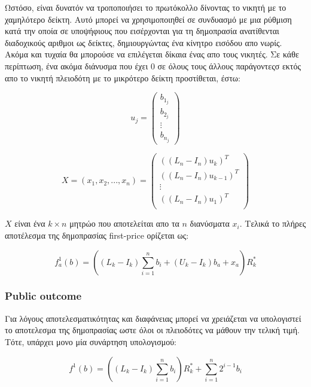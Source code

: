 \documentclass[letterpaper,11pt]{article}
\begin{document}
Ωστόσο, είναι δυνατόν να τροποποιήσει το πρωτόκολλο δίνοντας το νικητή με το χαμηλότερο δείκτη. Αυτό μπορεί να χρησιμοποιηθεί σε συνδυασμό με μια
ρύθμιση κατά την οποία σε υποψήφιους που εισέρχονται για τη δημοπρασία ανατίθενται διαδοχικούς αριθμοι ως δείκτες, δημιουργώντας ένα κίνητρο
εισόδου απο νωρίς. Ακόμα και τυχαία θα μπορούσε να επιλέγεται δίκαια ένας απο τους νικητές. Σε κάθε περίπτωση, ένα ακόμα διάνυσμα που έχει 0 σε
όλους τους άλλους παράγοντεςσ εκτός απο το νικητή πλειοδότη με το μικρότερο δείκτη προστίθεται, έστω:

\begin{displaymath}
	u_j =
	\left ( \begin{array}{c}
		b_{1_j} \\
		b_{2_j} \\
		\vdots	\\
		b_{n_j}
	\end{array} \right)	
\end{displaymath}

\begin{displaymath}
	X = (x_1, x_2,..., x_n) =
	\left ( \begin{array}{c}
		((L_n - I_n)u_k)^T \\
		((L_n - I_n)u_{k-1})^T \\
		\vdots \\
		((L_n - I_n)u_1)^T \\
	\end{array} \right)
\end{displaymath}

$X$ είναι ένα $k × n$ μητρώο που αποτελείται απο τα $n$ διανύσματα $x_i$. Τελικά το πλήρες αποτέλεσμα της δημοπρασίας first-price ορίζεται ως:

\begin{displaymath}
	f^1_a(b) = \left ( (L_k - I_k) \sum_{i=1}^{n} b_i + (U_k - I_k) b_a + x_a \right ) R^*_k
\end{displaymath}

\subsubsection{Public outcome} Για λόγους αποτελεσματικότητας και διαφάνειας μπορεί να χρειάζεται να υπολογιστεί το αποτελεσμα της δημοπρασίας ωστε
όλοι οι πλειοδότες να μάθουν την τελική τιμή. Τότε, υπάρχει μονο μία συνάρτηση υπολογισμού:

\begin{displaymath}
	f^1(b) = \left ( (L_k - I_k) \sum_{i=1}^{n} b_i \right ) R^*_k + \sum_{i=1}^{n} 2^{i-1} b_i
\end{displaymath}
\end{document}
